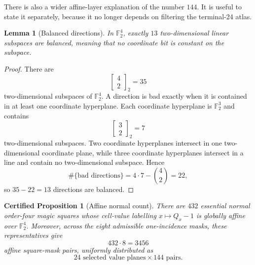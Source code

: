 \documentclass[11pt,a4paper]{article}
\newtheorem{certprop}[theorem]{Certified Proposition}
\newtheorem{lemma}[theorem]{Lemma}
\theoremstyle{definition}
\theoremstyle{remark}
\newcommand{\F}{\mathbb F}
\begin{document}
There is also a wider affine-layer explanation of the number \(144\).  It is
useful to state it separately, because it no longer depends on filtering the
terminal-24 atlas.

\begin{lemma}[Balanced directions]
\label{lem:balanced-directions}
In \(\F_2^4\), exactly \(13\) two-dimensional linear subspaces are balanced,
meaning that no coordinate bit is constant on the subspace.
\end{lemma}

\begin{proof}
There are
\[
\left[\begin{matrix}4\\2\end{matrix}\right]_2=35
\]
two-dimensional subspaces of \(\F_2^4\).  A direction is bad exactly when it
is contained in at least one coordinate hyperplane.  Each coordinate
hyperplane is \(\F_2^3\) and contains
\[
\left[\begin{matrix}3\\2\end{matrix}\right]_2=7
\]
two-dimensional subspaces.  Two coordinate hyperplanes intersect in one
two-dimensional coordinate plane, while three coordinate hyperplanes
intersect in a line and contain no two-dimensional subspace.  Hence
\[
\#\{\text{bad directions}\}=4\cdot7-\binom42=22,
\]
so \(35-22=13\) directions are balanced.
\end{proof}

\begin{certprop}[Affine normal count]
\label{prop:affine-normal-count}
There are \(432\) essential normal order-four magic squares whose cell-value
labelling \(x\mapsto Q_x-1\) is globally affine over \(\F_2^4\).  Moreover,
across the eight admissible one-incidence masks, these representatives give
\[
432\cdot8=3456
\]
affine square-mask pairs, uniformly distributed as
\[
24\text{ selected value planes}\times144\text{ pairs}.
\]
\end{certprop}
\end{document}
